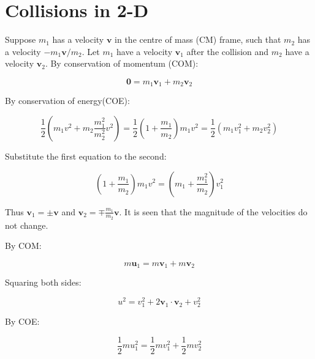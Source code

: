 \documentclass[12pt]{article}
\begin{document}



\pagebreak
\section*{Collisions in 2-D}



Suppose $m_{1}$ has a velocity $\mathbf{v}$ in the centre of mass (CM) frame, such that $m_{2}$ has a velocity $-m_{1}\mathbf{v}/m_{2}$. Let $m_{1}$ have a velocity $\mathbf{v}_{1}$ after the collision and $m_{2}$ have a velocity $\mathbf{v}_{2}$. By conservation of momentum (COM):

\begin{equation}
    \mathbf{0} = m_{1} \mathbf{v}_{1} + m_{2} \mathbf{v}_{2}
\end{equation}

By conservation of energy(COE):

\begin{equation}
    \frac{1}{2} \left( m_{1} v^{2} + m_{2} \frac{m_{1}^{2}}{m_{2}^{2}} v^{2} \right) = \frac{1}{2} \left( 1 + \frac{m_{1}}{m_{2}} \right) m_{1} v^{2} = \frac{1}{2} (m_{1} v_{1}^{2} + m_{2} v_{2}^{2})
\end{equation}

Substitute the first equation to the second:

\begin{equation}
    \left( 1 + \frac{m_{1}}{m_{2}} \right) m_{1} v^{2} = \left( m_{1} + \frac{m_{1}^{2}}{m_{2}} \right) v_{1}^{2}
\end{equation}

Thus $\mathbf{v}_{1} = \pm \mathbf{v}$ and $\mathbf{v}_{2} = \mp \frac{m_{1}}{m_{2}} \mathbf{v}$. It is seen that the magnitude of the velocities do not change.

By COM:

\begin{equation}
    m \mathbf{u}_{1} = m \mathbf{v}_{1} + m \mathbf{v}_{2}
\end{equation}

Squaring both sides:

\begin{equation}
    u^{2} = v_{1}^{2} + 2 \mathbf{v}_{1} \cdot \mathbf{v}_{2} + v_{2}^{2}
\end{equation}

By COE:

\begin{equation}
    \frac{1}{2} m u_{1}^{2} = \frac{1}{2} m v_{1}^{2} + \frac{1}{2} m v_{2}^{2}
\end{equation}
\end{document}
